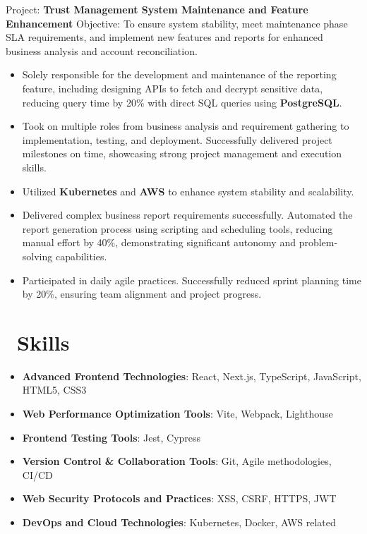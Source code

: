\documentclass{resume}
\begin{document}
Project: \textbf{Trust Management System Maintenance and Feature Enhancement}
Objective: To ensure system stability, meet maintenance phase SLA requirements, and implement new features and reports for enhanced business analysis and account reconciliation.
\begin{itemize}
  \item Solely responsible for the development and maintenance of the reporting feature, including designing APIs to fetch and decrypt sensitive data, reducing query time by 20\% with direct SQL queries using \textbf{PostgreSQL}.
  \item Took on multiple roles from business analysis and requirement gathering to implementation, testing, and deployment. Successfully delivered project milestones on time, showcasing strong project management and execution skills.
  \item Utilized \textbf{Kubernetes} and \textbf{AWS} to enhance system stability and scalability.
  \item Delivered complex business report requirements successfully. Automated the report generation process using scripting and scheduling tools, reducing manual effort by 40\%, demonstrating significant autonomy and problem-solving capabilities.
  \item Participated in daily agile practices. Successfully reduced sprint planning time by 20\%, ensuring team alignment and project progress.
\end{itemize}

\section{\faCogs\ Skills}
\begin{itemize}[parsep=0.5ex]
  \item \textbf{Advanced Frontend Technologies}: React, Next.js, TypeScript, JavaScript, HTML5, CSS3
  \item \textbf{Web Performance Optimization Tools}: Vite, Webpack, Lighthouse
  \item \textbf{Frontend Testing Tools}: Jest, Cypress
  \item \textbf{Version Control \& Collaboration Tools}: Git, Agile methodologies, CI/CD
  \item \textbf{Web Security Protocols and Practices}: XSS, CSRF, HTTPS, JWT
  \item \textbf{DevOps and Cloud Technologies}: Kubernetes, Docker, AWS related 
\end{itemize}
\end{document}
